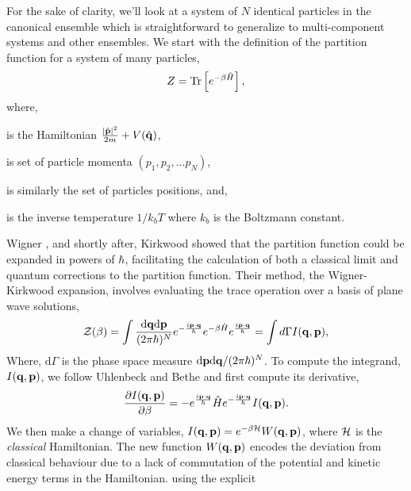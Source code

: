 For the sake of clarity, we'll look at a system of $N$ identical particles in
the canonical ensemble which is straightforward to generalize to
multi-component systems and other ensembles.  We start with the definition of
the partition function for a system of many particles,  
%
\begin{equation}
    \label{eq:quantum_partition}
    Z = \mathrm{Tr}\left[ e^{-\beta\hat{H}} \right], 
\end{equation} 
%
where, 
%
\begin{description}[align=right, labelwidth=1cm]
    \item[$\hat{H}$]{ is the Hamiltonian $\frac{\vert\hat{\mathbf{p}}\vert^2}{2m} +
        V(\hat{\mathbf{q}})$, 
    }
    \item[$\p$] is set of particle momenta $(p_1, p_2, ...p_N)$,
    \item[$\q$] is similarly the set of particles positions, and,
    \item[$\beta$]{ is the inverse temperature $1 / k_b T$ where $k_b$ is the
        Boltzmann constant.
    }  
\end{description}
%
Wigner \cite{PhysRev.40.749}, and shortly after, Kirkwood \cite{PhysRev.44.31}
showed that the partition function could be expanded in powers of $\hbar$,
facilitating the calculation of both a classical limit and quantum corrections
to the partition function.  Their method, the Wigner-Kirkwood expansion,
involves evaluating the trace operation over a basis of plane wave solutions,
%
\begin{equation}
    \mathcal{Z}(\beta) = \int \frac{\mathrm{d}\mathbf{q} \mathrm{d}\mathbf{p}}{(2\pi \hbar)^N}
        e^{-\frac{i\mathbf{p}\cdot\mathbf{q}}{\hbar}} 
        e^{-\beta \hat{H}} e^{\frac{i\mathbf{p}\cdot\mathbf{q}}{\hbar}} 
        = \int d\Gamma I(\mathbf{q}, \mathbf{p}), 
        \label{plane_wave_trace}
\end{equation}
%
Where, $\mathrm{d}\Gamma$ is the phase space measure
$\mathrm{d}\mathbf{p}\mathrm{d}\mathbf{q}/(2\pi\hbar)^N$.  To compute the integrand, $I(\mathbf{q}, \mathbf{p})$,
we follow Uhlenbeck and Bethe \cite{Uhlenbeck1936729} and first compute its
derivative,
%
\begin{equation}
    \frac{\partial I(\mathbf{q}, \mathbf{p})}{\partial \beta} = -e^{\frac{i\mathbf{p}\cdot\mathbf{q}}{\hbar}}\hat{H}e^{-\frac{i\mathbf{p}\cdot\mathbf{q}}{\hbar}} I(\mathbf{q}, \mathbf{p}).
     \label{I_deriv}
\end{equation}
%
We then make a change of variables, $I(\mathbf{q}, \mathbf{p}) = e^{-\beta\mathcal{H}}W(\mathbf{q}, \mathbf{p})$,
where $\mathcal{H}$ is the {\it classical} Hamiltonian. The new function $W(\mathbf{q}, \mathbf{p})$ encodes
the deviation from classical behaviour due to a lack of commutation of the
potential and kinetic energy terms in the Hamiltonian.  using the explicit 
